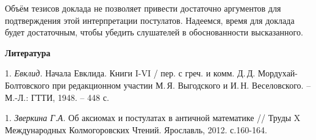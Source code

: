 Объём тезисов доклада не позволяет привести достаточно аргументов для подтверждения этой интерпретации постулатов.
Надеемся, время для доклада будет достаточным, чтобы убедить слушателей в обоснованности высказанного.





\smallskip \centerline{\bf Литература}\nopagebreak

1. {\it Евклид.} Начала Евклида. Книги I-VI  / пер. с греч. и комм. Д.\,Д. Мор\-ду\-хай-Бол\-тов\-ско\-го при редакционном
участии М.\,Я. Вы\-год\-ско\-го и И.\,Н. Веселовского. -- М.-Л.: ГТТИ, 1948. -- 448 с.

1. {\it Зверкина Г.А.} Об аксиомах и постулатах в античной математике // Труды X Международных Колмогоровских Чтений. Ярославль,
2012.  с.160-164.

